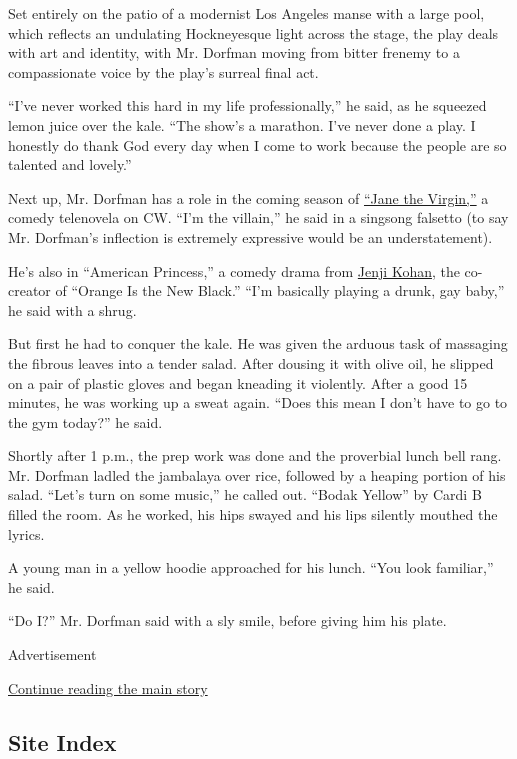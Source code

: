 Set entirely on the patio of a modernist Los Angeles manse with a large
pool, which reflects an undulating Hockneyesque light across the stage,
the play deals with art and identity, with Mr. Dorfman moving from
bitter frenemy to a compassionate voice by the play's surreal final act.

``I've never worked this hard in my life professionally,'' he said, as
he squeezed lemon juice over the kale. ``The show's a marathon. I've
never done a play. I honestly do thank God every day when I come to work
because the people are so talented and lovely.''

Next up, Mr. Dorfman has a role in the coming season of
\href{https://www.nytimes.com/watching/recommendations/watching-tv-jane-the-virgin}{``Jane
the Virgin,''} a comedy telenovela on CW. ``I'm the villain,'' he said
in a singsong falsetto (to say Mr. Dorfman's inflection is extremely
expressive would be an understatement).

He's also in ``American Princess,'' a comedy drama from
\href{https://www.nytimes.com/2017/06/08/arts/television/jenji-kohan-interview-orange-is-the-new-black-season-4.html}{Jenji
Kohan}, the co-creator of ``Orange Is the New Black.'' ``I'm basically
playing a drunk, gay baby,'' he said with a shrug.

But first he had to conquer the kale. He was given the arduous task of
massaging the fibrous leaves into a tender salad. After dousing it with
olive oil, he slipped on a pair of plastic gloves and began kneading it
violently. After a good 15 minutes, he was working up a sweat again.
``Does this mean I don't have to go to the gym today?'' he said.

Shortly after 1 p.m., the prep work was done and the proverbial lunch
bell rang. Mr. Dorfman ladled the jambalaya over rice, followed by a
heaping portion of his salad. ``Let's turn on some music,'' he called
out. ``Bodak Yellow'' by Cardi B filled the room. As he worked, his hips
swayed and his lips silently mouthed the lyrics.

A young man in a yellow hoodie approached for his lunch. ``You look
familiar,'' he said.

``Do I?'' Mr. Dorfman said with a sly smile, before giving him his
plate.

Advertisement

\protect\hyperlink{after-bottom}{Continue reading the main story}

\hypertarget{site-index}{%
\subsection{Site Index}\label{site-index}}


